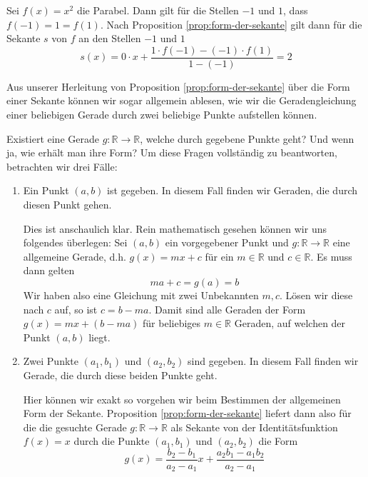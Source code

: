\begin{example}\label{bsp:konstante-sekante}
    Sei \(f(x)=x^2\) die Parabel. Dann gilt für die Stellen \(-1\) und \(1\), dass \(f(-1) = 1 = f(1)\). Nach Proposition \ref{prop:form-der-sekante} gilt dann für die Sekante \(s\) von \(f\) an den Stellen \(-1\) und \(1\) 
    \begin{equation*}
        s(x) = 0 \cdot x + \frac{1\cdot f(-1)-(-1)\cdot f(1)}{1 - (-1)} = 2
    \end{equation*}
\end{example}
Aus unserer Herleitung von Proposition \ref{prop:form-der-sekante} über die Form einer Sekante können wir sogar allgemein ablesen, wie wir die Geradengleichung einer beliebigen Gerade durch zwei beliebige Punkte aufstellen können. 

\begin{problem}
    Existiert eine Gerade \(g: \mathbb R\to\mathbb R\), welche durch gegebene Punkte geht? Und wenn ja, wie erhält man ihre Form? Um diese Fragen vollständig zu beantworten, betrachten wir drei Fälle: 
    \begin{enumerate}
        \item Ein Punkt \((a,b)\) ist gegeben. In diesem Fall finden wir  Geraden, die durch diesen Punkt gehen. \par
        \begin{normalfont}
            Dies ist anschaulich klar. Rein mathematisch gesehen können wir uns folgendes überlegen: Sei \((a,b)\) ein vorgegebener Punkt und \(g:\mathbb R\to\mathbb R\) eine allgemeine Gerade, d.h. \(g(x) = mx+c\) für ein \(m\in \mathbb R\) und \(c\in \mathbb R\). Es muss dann gelten 
            \begin{equation*}
                ma + c = g(a) = b
            \end{equation*}
            Wir haben also eine Gleichung mit zwei Unbekannten \(m,c\). Lösen wir diese nach \(c\) auf, so ist \(c = b - ma\). Damit sind alle Geraden der Form \(g(x) = mx + (b-ma)\) für beliebiges \(m \in \mathbb R\) Geraden, auf welchen der Punkt \((a,b)\) liegt. 
        \end{normalfont}
        
        \item Zwei Punkte \((a_1,b_1)\) und \((a_2, b_2)\) sind gegeben. In diesem Fall finden wir  Gerade, die durch diese beiden Punkte geht. \par
        \begin{normalfont}
            Hier können wir exakt so vorgehen wir beim Bestimmen der allgemeinen Form der Sekante. Proposition \ref{prop:form-der-sekante} liefert dann also für die die gesuchte Gerade \(g:\mathbb R\to \mathbb R\) als Sekante von der Identitätsfunktion \(f(x) = x\) durch die Punkte \((a_1 , b_1)\) und \((a_2, b_2)\) die Form
            \begin{equation*}
                g(x) = \frac{b_2 - b_1}{a_2 - a_1}x + \frac{a_2b_1 - a_1b_2}{a_2 - a_1}
            \end{equation*}
        \end{normalfont}
        

\end{enumerate}
\end{problem}
